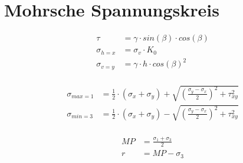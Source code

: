 \section{Mohrsche Spannungskreis}

\begin{minipage}{0.252\linewidth}
	\begin{align*}
		\tau	 		&= \gamma \cdot sin(\beta) \cdot cos(\beta) \\
		\sigma_{h=x} 	&= \sigma_v \cdot K_0 \\
		\sigma_{v=y} 	&= \gamma \cdot h \cdot cos(\beta)^2 \\ 
	\end{align*}
\end{minipage}
\begin{minipage}{0.5\linewidth}
	\begin{align*}
		\sigma_{max=1}	&=\frac{1}{2} \cdot (\sigma_x + \sigma_y) + \sqrt{\left(\frac{\sigma_y - \sigma_x}{2}\right)^2 + \tau_{xy}^2} \\
	\sigma_{min=3}	&=\frac{1}{2} \cdot (\sigma_x + \sigma_y) - \sqrt{\left(\frac{\sigma_y - \sigma_x}{2}\right)^2 + \tau_{xy}^2} \\
	\end{align*}
\end{minipage}
\begin{minipage}{0.5\linewidth}
	\begin{align*}
	MP				&= \frac{\sigma_1 + \sigma_3}{2} \\
	r				&= MP - \sigma_3 \\
	\end{align*}
\end{minipage}






